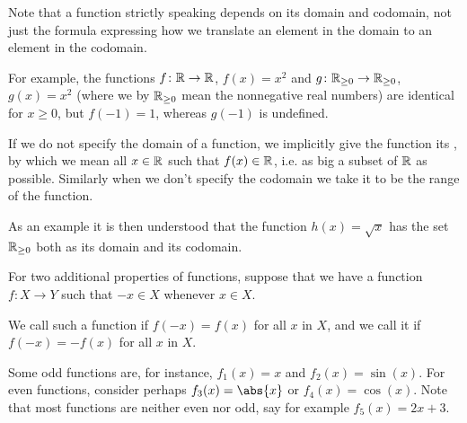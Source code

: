 \noindent
Note that a function strictly speaking depends on its domain and codomain, not just the formula expressing how we translate an element in the domain to an element in the codomain.

For example, the functions $f \colon \mathbb{R} \to \mathbb{R}$, $f(x) = x^2$ and $g \colon \mathbb{R}_{\geq 0} \to \mathbb{R}_{\geq 0}$, $g(x) = x^2$ (where we by $\mathbb{R}_{\geq 0}$ mean the nonnegative real numbers) are identical for $x \geq 0$, but $f(-1) = 1$, whereas $g(-1)$ is undefined.

If we do not specify the domain of a function, we implicitly give the function its , by which we mean all $x \in \mathbb{R}$ such that $f(x) \in \mathbb{R}$, i.e. as big a subset of $\mathbb{R}$ as possible. Similarly when we don't specify the codomain we take it to be the range of the function.

As an example it is then understood that the function $h(x) = \sqrt{x}$ has the set $\mathbb{R}_{\geq 0}$ both as its domain and its codomain.

For two additional properties of functions, suppose that we have a function $f \colon X \to Y$ such that $-x \in X$ whenever $x \in X$.

We call such a function  if $f(-x) = f(x)$ for all $x$ in $X$, and we call it  if $f(-x) = - f(x)$ for all $x$ in $X$.

Some odd functions are, for instance, $f_1(x) = x$ and $f_2(x) = \sin(x)$. For even functions, consider perhaps $f_3(x) = \abs{x}$ or $f_4(x) = \cos(x)$. Note that most functions are neither even nor odd, say for example $f_5(x) = 2x + 3$.
